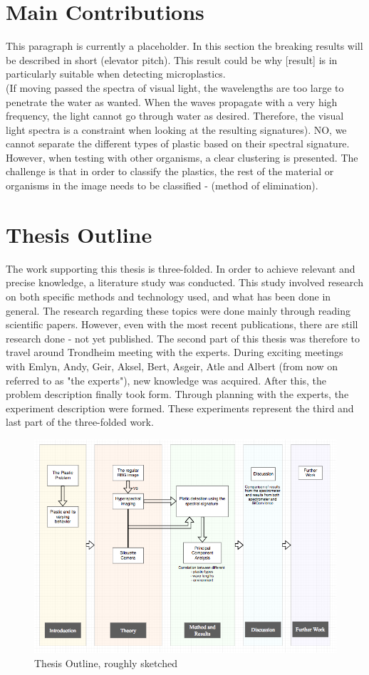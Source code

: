 \section{Main Contributions} This paragraph is currently a placeholder. In this section the breaking results will be described in short (elevator pitch). This result could be why [result] is in particularly suitable when detecting microplastics.
\\
(If moving passed the spectra of visual light, the wavelengths are too large to penetrate the water as wanted. When the waves propagate with a very high frequency, the light cannot go through water as desired. Therefore, the visual light spectra is a constraint when looking at the resulting signatures). NO, we cannot separate the different types of plastic based on their spectral signature. However, when testing with other organisms, a clear clustering is presented. The challenge is that in order to classify the plastics, the rest of the material or organisms in the image needs to be classified - (method of elimination). 

\section{Thesis Outline}
The work supporting this thesis is three-folded. In order to achieve relevant and precise knowledge, a literature study was conducted. This study involved research on both specific methods and technology used, and what has been done in general. The research regarding these topics were done mainly through reading scientific papers. However, even with the most recent publications, there are still research done - not yet published. The second part of this thesis was therefore to travel around Trondheim meeting with the experts. During exciting meetings with Emlyn, Andy, Geir, Aksel, Bert, Asgeir, Atle and Albert (from now on referred to as "the experts"), new knowledge was acquired. After this, the problem description finally took form. Through planning with the experts, the experiment description were formed. These experiments represent the third and last part of the three-folded work. 


\begin{figure}
  \includegraphics[width=\linewidth]{Images/outline.png}
  \caption{Thesis Outline, roughly sketched}
  \label{fig:outline}
\end{figure}

